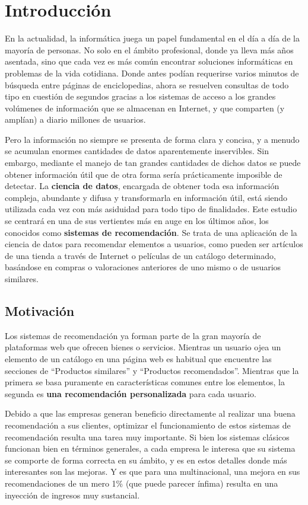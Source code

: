 \chapter{Introducción}

En la actualidad, la informática juega un papel fundamental en el día a día de la mayoría de personas. No solo en el ámbito profesional, donde ya lleva más años asentada, sino que cada vez es más común encontrar soluciones informáticas en problemas de la vida cotidiana. Donde antes podían requerirse varios minutos de búsqueda entre páginas de enciclopedias, ahora se resuelven consultas de todo tipo en cuestión de segundos gracias a los sistemas de acceso a los grandes volúmenes de información que se almacenan en Internet, y que comparten (y amplían) a diario millones de usuarios.

Pero la información no siempre se presenta de forma clara y concisa, y a menudo se acumulan enormes cantidades de datos aparentemente inservibles. Sin embargo, mediante el manejo de tan grandes cantidades de dichos datos se puede obtener información útil que de otra forma sería prácticamente imposible de detectar. La \textbf{ciencia de datos}, encargada de obtener toda esa información compleja, abundante y difusa y transformarla en información útil, está siendo utilizada cada vez con más asiduidad para todo tipo de finalidades. Este estudio se centrará en una de sus vertientes más en auge en los últimos años, los conocidos como \textbf{sistemas de recomendación}. Se trata de una aplicación de la ciencia de datos para recomendar elementos a usuarios, como pueden ser artículos de una tienda a través de Internet o películas de un catálogo determinado, basándose en compras o valoraciones anteriores de uno mismo o de usuarios similares.

\section{Motivación}

Los sistemas de recomendación \cite{introduction-recommender-systems} ya forman parte de la gran mayoría de plataformas web que ofrecen bienes o servicios. Mientras un usuario ojea un elemento de un catálogo en una página web es habitual que encuentre las secciones de ``Productos similares'' y ``Productos recomendados''. Mientras que la primera se basa puramente en características comunes entre los elementos, la segunda es \textbf{una recomendación personalizada} para cada usuario.

Debido a que las empresas generan beneficio directamente al realizar una buena recomendación a sus clientes, optimizar el funcionamiento de estos sistemas de recomendación resulta una tarea muy importante. Si bien los sistemas clásicos funcionan bien en términos generales, a cada empresa le interesa que su sistema se comporte de forma correcta en su ámbito, y es en estos detalles donde más interesantes son las mejoras. Y es que para una multinacional, una mejora en sus recomendaciones de un mero 1\% (que puede parecer ínfima) resulta en una inyección de ingresos muy sustancial.

